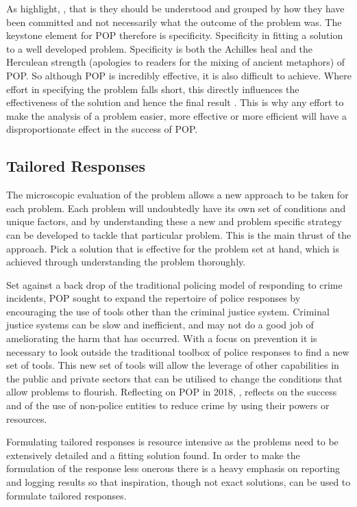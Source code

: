 As \textcite{felson1998opportunity} highlight, , that is they should be understood and grouped by how they have been committed and not necessarily what the outcome of the problem was. The keystone element for POP therefore is specificity. Specificity in fitting a solution to a well developed problem. Specificity is both the Achilles heal and the Herculean strength (apologies to readers for the mixing of ancient metaphors) of POP. So although POP is incredibly effective, it is also difficult to achieve. Where effort in specifying the problem falls short, this directly influences the effectiveness of the solution and hence the final result \parencite{maguire2015problem}. This is why any effort to make the analysis of a problem easier, more effective or more efficient will have a disproportionate effect in the success of POP.


\subsection{Tailored Responses} 
 
The microscopic evaluation of the problem allows a new approach to be taken for each problem. Each problem will undoubtedly have its own set of conditions and unique factors, and by understanding these a new and problem specific strategy can be developed to tackle that particular problem. This is the main thrust of the approach. Pick a solution that is effective for the problem set at hand, which is achieved through understanding the problem thoroughly.

 Set against a back drop of the traditional policing model of responding to crime incidents, POP sought to expand the repertoire of police responses by encouraging the use of tools other than the criminal justice system. Criminal justice systems can be slow and inefficient, and may not do a good job of ameliorating the harm that has occurred.  With a focus on prevention it is necessary to look outside the traditional toolbox of police responses to find a new set of tools. This new set of tools will allow the leverage of other capabilities in the public and private sectors that can be utilised to change the conditions that allow problems to flourish. Reflecting on POP in 2018, \textcite{stockholmlec}, reflects on the success and  of the use of non-police entities to reduce crime by using their powers or resources. 
 
Formulating tailored responses is resource intensive as the problems need to be extensively detailed and a fitting solution found. In order to make the formulation of the response less onerous there is a heavy emphasis on reporting and logging results so that inspiration, though not exact solutions, can be used to formulate tailored responses. 
 
